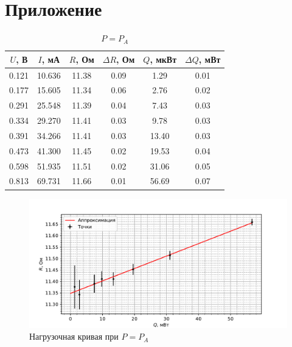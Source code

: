 \documentclass[12pt]{article}
\begin{document}
    \section{Приложение}
    \begin{table}[h]
        \centering
        \caption{$P = P_A$}
        \begin{tabular}{|c|c|c|c|c|c|}
        \hline
            $U$, В &  $I$, мА &     $R$, Ом & $\Delta R$, Ом &     $Q$, мкВт & $\Delta Q$, мВт \\ \hline
        0.121 & 10.636 & 11.38 &           0.09 &  1.29 &            0.01 \\ \hline
        0.177 & 15.605 & 11.34 &           0.06 &  2.76 &            0.02 \\ \hline
        0.291 & 25.548 & 11.39 &           0.04 &  7.43 &            0.03 \\ \hline
        0.334 & 29.270 & 11.41 &           0.03 &  9.78 &            0.03 \\ \hline
        0.391 & 34.266 & 11.41 &           0.03 & 13.40 &            0.03 \\ \hline
        0.473 & 41.300 & 11.45 &           0.02 & 19.53 &            0.04 \\ \hline
        0.598 & 51.935 & 11.51 &           0.02 & 31.06 &            0.05 \\ \hline
        0.813 & 69.731 & 11.66 &           0.01 & 56.69 &            0.07 \\ \hline
        \end{tabular}
    \end{table}

    \begin{figure}[H]
        \centering
        \includegraphics[width=\textwidth]{graphs/QR.pdf}
        \caption{Нагрузочная кривая при $P = P_A$}
    \end{figure}
\end{document}
